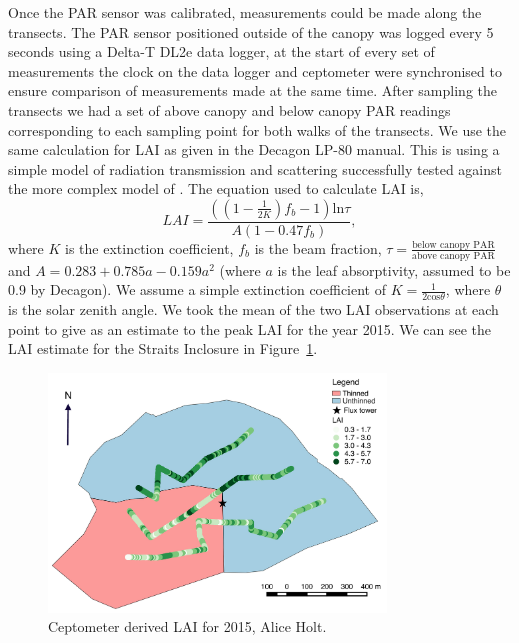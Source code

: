 Once the PAR sensor was calibrated, measurements could be made along the transects. The PAR sensor positioned outside of the canopy was logged every 5 seconds using a Delta-T DL2e data logger, at the start of every set of measurements the clock on the data logger and ceptometer were synchronised to ensure comparison of measurements made at the same time. After sampling the transects we had a set of above canopy and below canopy PAR readings corresponding to each sampling point for both walks of the transects. We use the same calculation for LAI as given in the Decagon LP-80 manual. This is using a simple model of radiation transmission and scattering successfully tested against the more complex model of \citet{norman1975photosynthesis}. The equation used to calculate LAI is,
\begin{equation}
LAI = \frac{((1-\frac{1}{2K})f_b - 1)\text{ln}\tau}{A(1-0.47f_b)},
\end{equation} 
where \(K\) is the extinction coefficient, \(f_b\) is the beam fraction, \(\tau = \frac{\text{below canopy PAR}}{\text{above canopy PAR}}\) and \(A = 0.283 + 0.785a - 0.159 a^2\) (where $a$ is the leaf absorptivity, assumed to be 0.9 by Decagon). We assume a simple extinction coefficient of \(K=\frac{1}{2\text{cos}\theta}\), where \(\theta\) is the solar zenith angle. We took the mean of the two LAI observations at each point to give as an estimate to the peak LAI for the year 2015. We can see the LAI estimate for the Straits Inclosure in Figure~\ref{chap4:fig:cept_lai}. 

\begin{figure}[ht]
    \centering
    \includegraphics[width=0.8\textwidth]{chapter/chapter4/lai_cept.pdf}
    \caption{Ceptometer derived LAI for 2015, Alice Holt.} \label{chap4:fig:cept_lai}
\end{figure}

